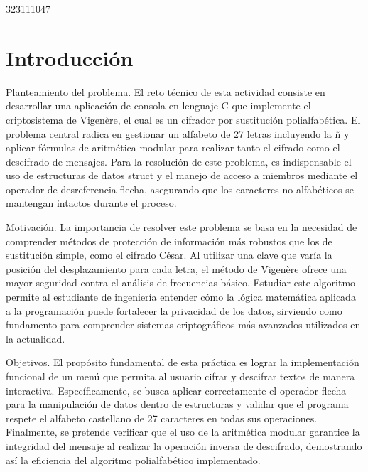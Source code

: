 323111047

\section{Introducción}

Planteamiento del problema. El reto técnico de esta actividad consiste en desarrollar una aplicación de consola en lenguaje C que implemente el criptosistema de Vigenère, el cual es un cifrador por sustitución polialfabética. El problema central radica en gestionar un alfabeto de 27 letras incluyendo la ñ y aplicar fórmulas de aritmética modular para realizar tanto el cifrado como el descifrado de mensajes. Para la resolución de este problema, es indispensable el uso de estructuras de datos struct y el manejo de acceso a miembros mediante el operador de desreferencia flecha, asegurando que los caracteres no alfabéticos se mantengan intactos durante el proceso.

\vspace{0.4cm}

Motivación. La importancia de resolver este problema se basa en la necesidad de comprender métodos de protección de información más robustos que los de sustitución simple, como el cifrado César. Al utilizar una clave que varía la posición del desplazamiento para cada letra, el método de Vigenère ofrece una mayor seguridad contra el análisis de frecuencias básico. Estudiar este algoritmo permite al estudiante de ingeniería entender cómo la lógica matemática aplicada a la programación puede fortalecer la privacidad de los datos, sirviendo como fundamento para comprender sistemas criptográficos más avanzados utilizados en la actualidad.

\vspace{0.4cm}

Objetivos. El propósito fundamental de esta práctica es lograr la implementación funcional de un menú que permita al usuario cifrar y descifrar textos de manera interactiva. Específicamente, se busca aplicar correctamente el operador flecha para la manipulación de datos dentro de estructuras y validar que el programa respete el alfabeto castellano de 27 caracteres en todas sus operaciones. Finalmente, se pretende verificar que el uso de la aritmética modular garantice la integridad del mensaje al realizar la operación inversa de descifrado, demostrando así la eficiencia del algoritmo polialfabético implementado.